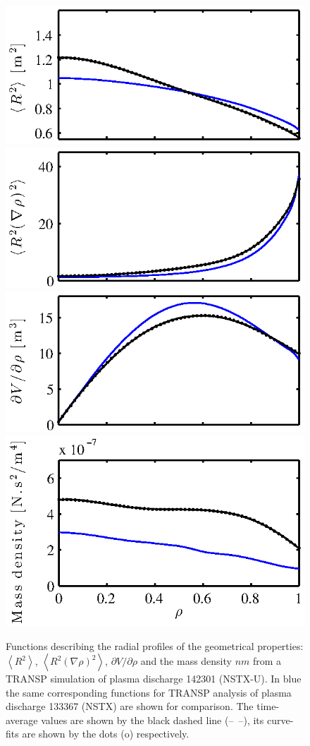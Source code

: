 \documentclass[12pt,lot, lof]{puthesis}
\begin{document}
\begin{figure} 
\centering
\includegraphics [width=0.6\linewidth]{chap10/fig1a_fr}  \hspace{-3.5em} \\
\includegraphics [width=0.6\linewidth]{chap10/fig1b_fr}  \hspace{-3.5em} \\
\includegraphics [width=0.6\linewidth]{chap10/fig1c_fr} \hspace{-3.5em} \\[-.4em]
\includegraphics [width=0.6\linewidth]{chap10/fig1d_fr} \hspace{-3.5em}
\caption{Functions describing the radial profiles of the geometrical properties: $\left< R^2 \right>$, $\left< R^2 (\nabla\rho)^2 \right>$, $\partial V/\partial \rho$ and  the mass density $ n m $ from a TRANSP simulation of plasma discharge 142301 (NSTX-U). In blue the same corresponding functions for TRANSP analysis of plasma discharge 133367 (NSTX) are shown for comparison. The time-average values are shown by the black dashed line (--~--), its curve-fits are shown by the dots (o) respectively.}
\label{fig:geofunc}
\end{figure}
\end{document}
